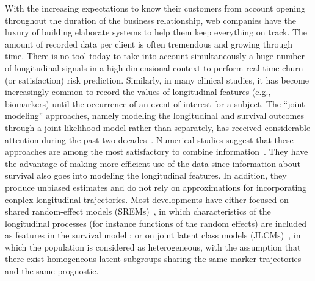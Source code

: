 \documentclass[11pt]{article}
\begin{document}
With the increasing expectations to know their customers from account opening throughout the duration of the business relationship, web companies have the luxury of building elaborate systems to help them keep everything on track. The amount of recorded data per client is often tremendous and growing through time. There is no tool today to take into account simultaneously a huge number of longitudinal signals in a high-dimensional context to perform real-time churn (or satisfaction) risk prediction.
Similarly, in many clinical studies, it has become increasingly common to record the values of longitudinal features (e.g., biomarkers) until the occurrence of an event of interest for a subject. The ``joint modeling'' approaches, namely modeling the longitudinal and survival outcomes through a joint likelihood model rather than separately, has received considerable attention during the past two decades~\citep{tsiatis2004joint}. Numerical studies suggest that these approaches are among the most satisfactory to combine information~\citep{yu2004joint}. They have the advantage of making more efficient use of the data since information about survival also goes into modeling the longitudinal features. In addition, they produce unbiased estimates and do not rely on approximations for incorporating conplex longitudinal trajectories. Most developments have either focused on shared random-effect models (SREMs)~\citep{wulfsohn1997joint}, in which characteristics of the longitudinal processes (for instance functions of the random effects) are included as features in the survival model ; or on joint latent class models (JLCMs)~\citep{vermunt2003latent}, in which the population is considered as heterogeneous, with the assumption that there exist homogeneous latent subgroups sharing the same marker trajectories and the same prognostic.
\end{document}
